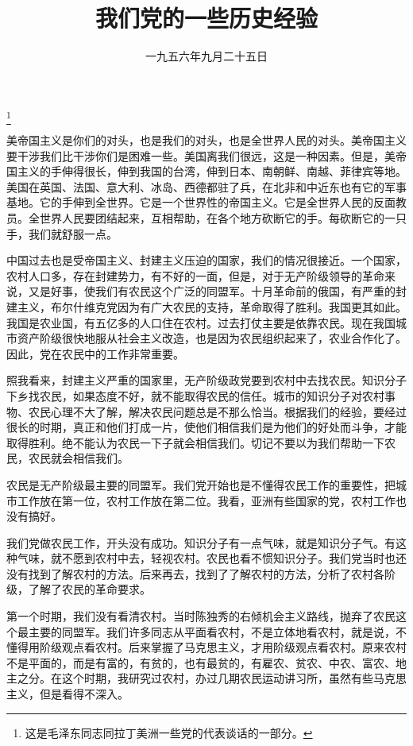 
\title{我们党的一些历史经验}
\date{一九五六年九月二十五日}
\thanks{这是毛泽东同志同拉丁美洲一些党的代表谈话的一部分。}
\maketitle


美帝国主义是你们的对头，也是我们的对头，也是全世界人民的对头。美帝国主义要干涉我们比干涉你们是困难一些。美国离我们很远，这是一种因素。但是，美帝国主义的手伸得很长，伸到我国的台湾，伸到日本、南朝鲜、南越、菲律宾等地。美国在英国、法国、意大利、冰岛、西德都驻了兵，在北非和中近东也有它的军事基地。它的手伸到全世界。它是一个世界性的帝国主义。它是全世界人民的反面教员。全世界人民要团结起来，互相帮助，在各个地方砍断它的手。每砍断它的一只手，我们就舒服一点。

中国过去也是受帝国主义、封建主义压迫的国家，我们的情况很接近。一个国家，农村人口多，存在封建势力，有不好的一面，但是，对于无产阶级领导的革命来说，又是好事，使我们有农民这个广泛的同盟军。十月革命前的俄国，有严重的封建主义，布尔什维克党因为有广大农民的支持，革命取得了胜利。我国更其如此。我国是农业国，有五亿多的人口住在农村。过去打仗主要是依靠农民。现在我国城市资产阶级很快地服从社会主义改造，也是因为农民组织起来了，农业合作化了。因此，党在农民中的工作非常重要。

照我看来，封建主义严重的国家里，无产阶级政党要到农村中去找农民。知识分子下乡找农民，如果态度不好，就不能取得农民的信任。城市的知识分子对农村事物、农民心理不大了解，解决农民问题总是不那么恰当。根据我们的经验，要经过很长的时期，真正和他们打成一片，使他们相信我们是为他们的好处而斗争，才能取得胜利。绝不能认为农民一下子就会相信我们。切记不要以为我们帮助一下农民，农民就会相信我们。

农民是无产阶级最主要的同盟军。我们党开始也是不懂得农民工作的重要性，把城市工作放在第一位，农村工作放在第二位。我看，亚洲有些国家的党，农村工作也没有搞好。

我们党做农民工作，开头没有成功。知识分子有一点气味，就是知识分子气。有这种气味，就不愿到农村中去，轻视农村。农民也看不惯知识分子。我们党当时也还没有找到了解农村的方法。后来再去，找到了了解农村的方法，分析了农村各阶级，了解了农民的革命要求。

第一个时期，我们没有看清农村。当时陈独秀的右倾机会主义路线，抛弃了农民这个最主要的同盟军。我们许多同志从平面看农村，不是立体地看农村，就是说，不懂得用阶级观点看农村。后来掌握了马克思主义，才用阶级观点看农村。原来农村不是平面的，而是有富的，有贫的，也有最贫的，有雇农、贫农、中农、富农、地主之分。在这个时期，我研究过农村，办过几期农民运动讲习所，虽然有些马克思主义，但是看得不深入。

